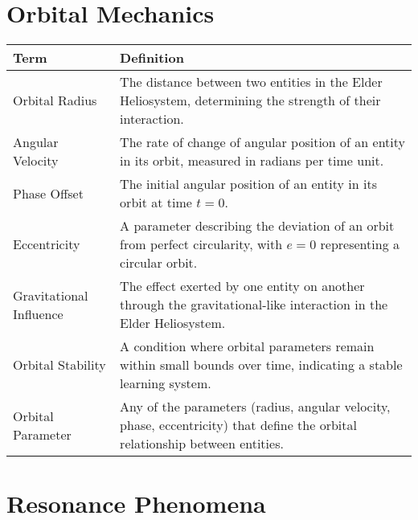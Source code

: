 \section{Orbital Mechanics}

\begin{center}
\begin{tabular}{|l|p{12cm}|}
\hline
\textbf{Term} & \textbf{Definition} \\
\hline
Orbital Radius & The distance between two entities in the Elder Heliosystem, determining the strength of their interaction. \\
\hline
Angular Velocity & The rate of change of angular position of an entity in its orbit, measured in radians per time unit. \\
\hline
Phase Offset & The initial angular position of an entity in its orbit at time $t=0$. \\
\hline
Eccentricity & A parameter describing the deviation of an orbit from perfect circularity, with $e=0$ representing a circular orbit. \\
\hline
Gravitational Influence & The effect exerted by one entity on another through the gravitational-like interaction in the Elder Heliosystem. \\
\hline
Orbital Stability & A condition where orbital parameters remain within small bounds over time, indicating a stable learning system. \\
\hline
Orbital Parameter & Any of the parameters (radius, angular velocity, phase, eccentricity) that define the orbital relationship between entities. \\
\hline
\end{tabular}
\label{tab:orbital_terminology}
\end{center}

\section{Resonance Phenomena}

